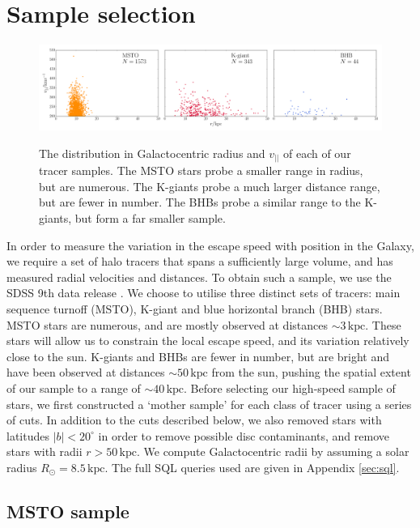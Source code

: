 \documentclass[useAMS,twocolumn,usenatbib]{mn2e}
\def\kpc{{\,\mathrm{kpc}}}
\def\vlos{{v_{||}}}
\begin{document}
\section{Sample selection}

\begin{figure}
\includegraphics[width=2\columnwidth]{plots/tracer_distributions}\\
\caption{The distribution in Galactocentric radius and $\vlos$ of each 
of our tracer samples. The MSTO stars probe a smaller range in radius, 
but are numerous. The K-giants probe a much larger distance range, 
but are fewer in number. The BHBs probe a similar range to the K-giants, 
but form a far smaller sample.}
\label{fig:data}
\end{figure}

In order to measure the variation in the escape speed with position in the Galaxy, 
we require a set of halo tracers that spans a sufficiently large volume, and has 
measured radial velocities and distances. To obtain such a sample, we use the 
SDSS 9th data release \citep{Ah12}. We choose to utilise three distinct sets of tracers: 
main sequence turnoff (MSTO), K-giant and blue horizontal branch (BHB) stars. MSTO 
stars are numerous, and are mostly observed at distances $\sim 3\kpc$. These stars 
will allow us to constrain the local escape speed, and its variation relatively close 
to the sun. K-giants and BHBs are fewer in number, but are bright and have been observed at distances 
$\sim 50\kpc$ from the sun, pushing the spatial extent of our sample to a range of 
$\sim 40\kpc$. Before selecting our high-speed sample of stars, we first constructed a 
`mother sample' for each class of tracer using a series of cuts. In addition to the cuts described 
below, we also removed stars with latitudes $|b| < 20^\circ$ in order to remove possible disc contaminants, 
and remove stars with radii $r>50\kpc$. We compute Galactocentric radii by assuming a 
solar radius $R_\odot = 8.5\kpc$. The full {\sc SQL} queries used are given in Appendix \ref{sec:sql}.

\subsection{MSTO sample}
\end{document}
